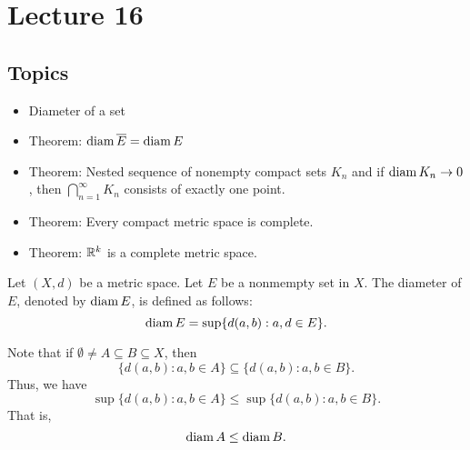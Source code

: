 \documentclass[a4paper]{article}
\begin{document}
\section{Lecture 16}

\subsection{Topics}

\begin{itemize}
    \item Diameter of a set 
    \item Theorem: \( \operatorname{diam} \overline{E} = \operatorname{diam} E   \)
    \item Theorem: Nested sequence of nonempty compact sets \( {K}_{n} \) and if \( \operatorname{diam} {K}_{n} \to 0   \), then \( \bigcap_{ n=1  }^{ \infty  }  {K}_{n} \) consists of exactly one point.
    \item Theorem: Every compact metric space is complete.
    \item Theorem: \( \mathbb{R}^{k} \) is a complete metric space.
\end{itemize}

\begin{definition}
    Let \( (X,d) \) be a metric space. Let \( E  \) be a nonmempty set in \( X  \). The diameter of \( E  \), denoted by \( \operatorname{diam} E  \), is defined as follows:
    \[  \operatorname{diam} E = \sup \{ d(a,b) : a,d \in E  \}.  \]
\end{definition}

\begin{remark}
    Note that if \( \emptyset \neq A \subseteq  B \subseteq X   \), then 
    \[  \{ d(a,b) : a,b \in A  \}  \subseteq  \{ d(a,b) : a,b  \in B\}. \]
    Thus, we have 
    \[  \sup \{ d(a,b) : a,b  \in A \}  \leq \sup \{ d(a,b) : a,b \in B \}. \]
    That is, 
    \[  \operatorname{diam} A \leq \operatorname{diam} B. \]
\end{remark}
\end{document}
